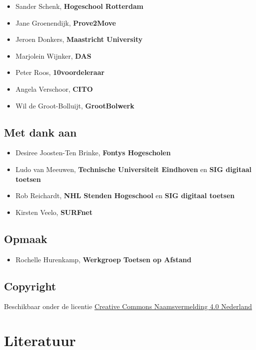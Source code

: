 \documentclass[
  letterpaper,
  DIV=11,
  numbers=noendperiod]{scrreprt}
\providecommand{\tightlist}{%
  \setlength{\itemsep}{0pt}\setlength{\parskip}{0pt}}\usepackage{longtable,booktabs,array}
\begin{document}
\begin{itemize}
\tightlist
\item
  Sander Schenk, \textbf{Hogeschool Rotterdam}
\item
  Jane Groenendijk, \textbf{Prove2Move}
\item
  Jeroen Donkers, \textbf{Maastricht University}
\item
  Marjolein Wijnker, \textbf{DAS}
\item
  Peter Roos, \textbf{10voordeleraar}
\item
  Angela Verschoor, \textbf{CITO}
\item
  Wil de Groot-Bolluijt, \textbf{GrootBolwerk}
\end{itemize}

\hypertarget{met-dank-aan}{%
\section{Met dank aan}\label{met-dank-aan}}

\begin{itemize}
\tightlist
\item
  Desiree Joosten-Ten Brinke, \textbf{Fontys Hogescholen}
\item
  Ludo van Meeuwen, \textbf{Technische Universiteit Eindhoven} en
  \textbf{SIG digitaal toetsen}
\item
  Rob Reichardt, \textbf{NHL Stenden Hogeschool} en \textbf{SIG digitaal
  toetsen}
\item
  Kirsten Veelo, \textbf{SURFnet}
\end{itemize}

\hypertarget{opmaak}{%
\section{Opmaak}\label{opmaak}}

\begin{itemize}
\tightlist
\item
  Rochelle Hurenkamp, \textbf{Werkgroep Toetsen op Afstand}
\end{itemize}

\hypertarget{copyright}{%
\section{Copyright}\label{copyright}}

Beschikbaar onder de licentie
\href{https://creativecommons.org/licenses/by/4.0/deed.nl}{Creative
Commons Naamsvermelding 4.0 Nederland}


\hypertarget{literatuur}{%
\chapter{Literatuur}\label{literatuur}}
\end{document}
